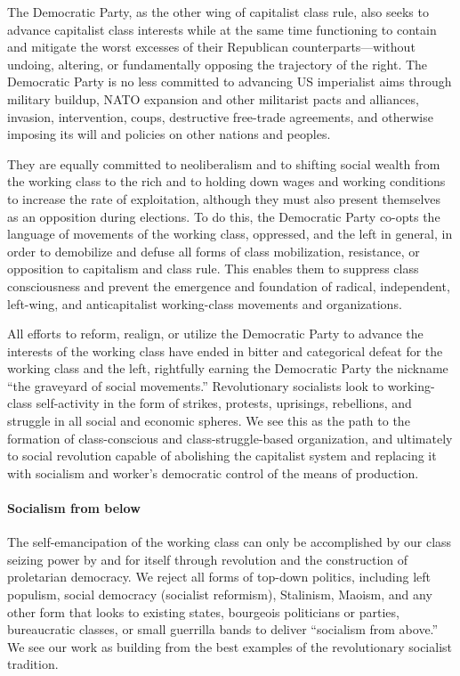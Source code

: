 The Democratic Party, as the other wing of capitalist class rule, also seeks to advance capitalist class interests while at the same time functioning to contain and mitigate the worst excesses of their Republican counterparts---without undoing, altering, or fundamentally opposing the trajectory of the right. The Democratic Party is no less committed to advancing US imperialist aims through military buildup, NATO expansion and other militarist pacts and alliances, invasion, intervention, coups, destructive free-trade agreements, and otherwise imposing its will and policies on other nations and peoples.

They are equally committed to neoliberalism and to shifting social wealth from the working class to the rich and to holding down wages and working conditions to increase the rate of exploitation, although they must also present themselves as an opposition during elections. To do this, the Democratic Party co-opts the language of movements of the working class, oppressed, and the left in general, in order to demobilize and defuse all forms of class mobilization, resistance, or opposition to capitalism and class rule. This enables them to suppress class consciousness and prevent the emergence and foundation of radical, independent, left-wing, and anticapitalist working-class movements and organizations.

All efforts to reform, realign, or utilize the Democratic Party to advance the interests of the working class have ended in bitter and categorical defeat for the working class and the left, rightfully earning the Democratic Party the nickname ``the graveyard of social movements.'' Revolutionary socialists look to working-class self-activity in the form of strikes, protests, uprisings, rebellions, and struggle in all social and economic spheres. We see this as the path to the formation of class-conscious and class-struggle-based organization, and ultimately to social revolution capable of abolishing the capitalist system and replacing it with socialism and worker's democratic control of the means of production.

\paragraph{Socialism from below}

The self-emancipation of the working class can only be accomplished by our class seizing power by and for itself through revolution and the construction of proletarian democracy. We reject all forms of top-down politics, including left populism, social democracy (socialist reformism), Stalinism, Maoism, and any other form that looks to existing states, bourgeois politicians or parties, bureaucratic classes, or small guerrilla bands to deliver ``socialism from above.'' We see our work as building from the best examples of the revolutionary socialist tradition.

